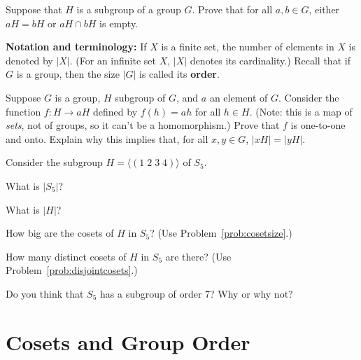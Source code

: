 \begin{problem}\label{prob:disjointcosets}
Suppose that \(H\) is a subgroup of a group \(G\). Prove that for all \(a,b\in G\), either \(aH = bH\) or \(aH \cap bH\) is empty.
\begin{annotation}
\end{annotation}
\end{problem}

\textbf{Notation and terminology:} If \(X\) is a finite set, the number of elements in \(X\) is denoted by \(\lvert X \rvert\). (For an infinite set \(X\), \(\lvert X\rvert\) denotes its cardinality.) Recall that if \(G\) is a group, then the size \(\lvert G\rvert\) is called its \textbf{order}.

\begin{problem}\label{prob:cosetsize}
Suppose \(G\) is a group, \(H\) subgroup of \(G\), and \(a\) an element of \(G\). Consider the function \(f : H \longrightarrow aH\) defined by \(f(h) = ah\) for all \(h \in H\). (Note: this is a map of \emph{sets}, not of groups, so it can't be a homomorphism.) Prove that \(f\) is one-to-one and onto. Explain why this implies that, for all  \(x,y\in G\), \(\lvert xH \rvert = \lvert yH \rvert\).
\end{problem}

\begin{problem}
Consider the subgroup \(H=\langle (1\;2\;3\;4) \rangle \) of \(S_5\).
\begin{problemparts}
  \item What is \(\lvert S_5 \rvert \)?
  \item What is \( \lvert H \rvert \)?
  \item How big are the cosets of \(H\) in \(S_5\)? (Use Problem~\ref{prob:cosetsize}.)
  \item How many distinct cosets of \(H\) in \(S_5\) are there? (Use Problem~\ref{prob:disjointcosets}.)
  \item Do you think that \(S_5\) has a subgroup of order 7? Why or why not?
\end{problemparts}
\end{problem}

\section{Cosets and Group Order}


